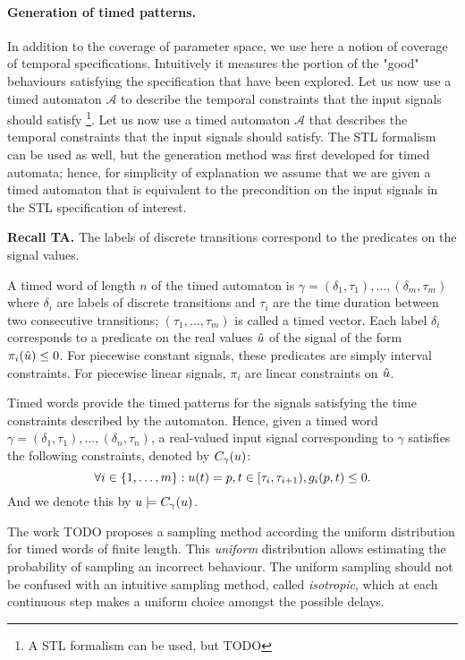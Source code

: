 \paragraph{Generation of timed patterns.} 
In addition to the coverage of parameter space, we use here a notion of coverage of temporal specifications. Intuitively it measures the portion of the "good" behaviours satisfying the specification that have been explored. Let us now use a timed automaton $\mathcal{A}$ to describe the temporal constraints that the input signals should satisfy \footnote{A STL formalism can be used, but {\color{red}TODO}}.  Let us now use a timed automaton $\mathcal{A}$ that describes the temporal constraints that the input signals should satisfy. The STL formalism can be used as well, but the generation method  was first developed for timed automata; hence, for simplicity of explanation we assume that we are given a timed automaton that is equivalent to the precondition on the input signals in the STL specification of interest. 


{\bf Recall TA.}
The labels of discrete transitions correspond to the predicates on the signal values.

A timed word of length $n$ of the timed automaton is $\gamma = (\delta_1, \tau_1), \ldots, (\delta_m, \tau_m)$ where $\delta_i$ are labels of discrete transitions and $\tau_i$ are the time duration between two consecutive transitions; $(\tau_1, \ldots, \tau_m)$ is called a timed vector. Each label $\delta_i$ corresponds to a predicate on the real values $\hat{u}$ of the signal of the form $\pi_i(\hat{u}) \le 0$. For piecewise constant signals, these predicates are simply interval constraints. For piecewise linear signals, $\pi_i$ are linear constraints on $\hat{u}$. 

Timed words provide the timed patterns for the signals satisfying the time constraints described by the automaton. Hence, given a timed word $\gamma = (\delta_1, \tau_1), \ldots, (\delta_n, \tau_n)$, a real-valued input signal corresponding to $\gamma$ satisfies the following constraints, denoted by $C_{\gamma}(u)$:
$$\forall i \in \{1, \ldots, m \}: u (t)= p, t \in [\tau_i, \tau_{i+1}), g_i(p,t)  \le 0.$$
And we denote this by $u \models C_{\gamma}(u)$.

The work \cite{BBBK16} {\color{red}TODO} proposes a sampling method according the uniform distribution for timed words of finite length. This \emph{uniform} distribution allows estimating the probability of sampling an incorrect behaviour. The uniform sampling should not be confused with an intuitive sampling method, called \emph{isotropic}, which at each continuous step makes a uniform choice amongst the possible delays.


